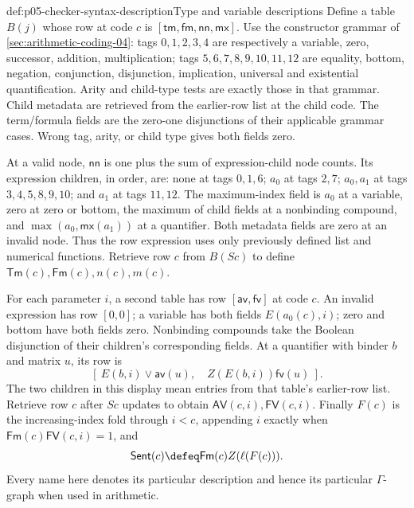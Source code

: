 \begin{hbdefinition}{def:p05-checker-syntax-description}{Type and variable descriptions}
Define a table \(B(j)\) whose row at code \(c\) is
\([\mathsf{tm},\mathsf{fm},\mathsf{nn},\mathsf{mx}]\).
Use the constructor grammar of \cref{sec:arithmetic-coding-04}: tags
\(0,1,2,3,4\) are respectively a variable, zero, successor, addition,
multiplication; tags \(5,6,7,8,9,10,11,12\) are equality, bottom,
negation, conjunction, disjunction, implication, universal and existential
quantification.  Arity and child-type tests are exactly those in that grammar.
Child metadata are retrieved from the earlier-row list at the child code.
The term/formula fields are the zero-one disjunctions of their applicable
grammar cases.  Wrong tag, arity, or child type gives both fields zero.

At a valid node, \(\mathsf{nn}\) is one plus the sum of expression-child
node counts.  Its expression children, in order, are: none at tags \(0,1,6\);
\(a_0\) at tags \(2,7\); \(a_0,a_1\) at tags
\(3,4,5,8,9,10\); and \(a_1\) at tags \(11,12\).
The maximum-index field is \(a_0\) at a variable, zero at zero or bottom,
the maximum of child fields at a nonbinding compound, and
\(\max(a_0,\mathsf{mx}(a_1))\) at a quantifier.  Both metadata fields
are zero at an invalid node.  Thus the row expression uses only previously
defined list and numerical functions.  Retrieve row \(c\) from \(B(Sc)\)
to define \(\mathsf{Tm}(c),\mathsf{Fm}(c),n(c),m(c)\).

For each parameter \(i\), a second table has row
\([\mathsf{av},\mathsf{fv}]\) at code \(c\).  An invalid expression
has row \([0,0]\); a variable has both fields \(E(a_0(c),i)\); zero
and bottom have both fields zero.  Nonbinding compounds take the Boolean
disjunction of their children's corresponding fields.  At a quantifier with
binder \(b\) and matrix \(u\), its row is
\[
 [\ E(b,i)\lor\mathsf{av}(u),\quad
                  Z(E(b,i))\mathsf{fv}(u)\ ].
\]
The two children in this display mean entries from that table's earlier-row
list.  Retrieve row \(c\) after \(Sc\) updates to obtain
\(\mathsf{AV}(c,i),\mathsf{FV}(c,i)\).
Finally \(F(c)\) is the increasing-index fold through \(i<c\), appending
\(i\) exactly when \(\mathsf{Fm}(c)\mathsf{FV}(c,i)=1\), and
\[
 \mathsf{Sent}(c)\defeq\mathsf{Fm}(c)Z(\ell(F(c))).
\]
Every name here denotes its particular description and hence its particular
\(\Gamma\)-graph when used in arithmetic.
\end{hbdefinition}

